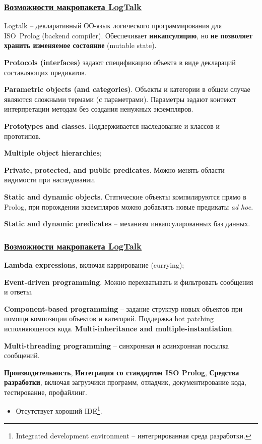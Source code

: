 \documentclass[10pt]{beamer}
\begin{document}
\begin{frame}
  \frametitle{\href{https://logtalk.org/features.html}{Возможности макропакета LogTalk}}
  Logtalk -- декларативный ОО-язык логического программирования для ISO~Prolog (backend compiler). Обеспечивает \textbf{инкапсуляцию}, но \textbf{не позволяет хранить изменяемое состояние} (mutable state).

  \textbf{Protocols (interfaces)} задают спецификацию объекта в виде деклараций составляющих предикатов.

  \textbf{Parametric objects (and categories)}. Объекты и категории в общем случае являются сложными термами (с параметрами). Параметры задают контекст интерпретации методам без создания ненужных экземпляров.

\textbf{Prototypes and classes}. Поддерживается наследование и классов и прототипов.


\textbf{Multiple object hierarchies};

\textbf{Private, protected, and public predicates}. Можно менять области видимости при наследовании.


\textbf{Static and dynamic objects}. Статические объекты компилируются прямо в Prolog, при порождении экземпляров можно добавлять новые предикаты \emph{ad hoc}.


\textbf{Static and dynamic predicates} -- механизм инкапсулированных баз данных.
\end{frame}

\begin{frame}
  \frametitle{\href{https://logtalk.org/features.html}{Возможности макропакета LogTalk}}
\textbf{Lambda expressions}, включая каррирование (currying);

\textbf{Event-driven programming}. Можно перехватывать и фильтровать сообщения и ответы.


\textbf{Component-based programming} -- задание структур новых объектов при помощи композиции объектов и категорий. Поддержка hot patching исполняющегося кода.
\textbf{Multi-inheritance and multiple-instantiation}.

\textbf{Multi-threading programming} -- синхронная и асинхронная посылка сообщений.

\textbf{Производительность}, \textbf{Интеграция со стандартом ISO Prolog}, \textbf{Средства разработки}, включая загрузчики программ, отладчик, документирование кода, тестирование, профайлинг.

\vspace{1em}
\begin{itemize}
\item Отсутствует хороший IDE\footnote{Integrated development environment -- интегрированная среда разработки.}.
\end{itemize}
\end{frame}
\end{document}
